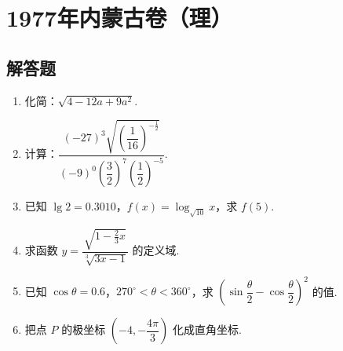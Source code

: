 \chapter{1977年内蒙古卷（理）}

\section{解答题}

\begin{problem}
\begin{enumerate}
\item 化简：\(\sqrt{4-12a+9a^2}\).

\item 计算：\(\dfrac{\left(-27\right)^3\sqrt{\left(\dfrac{1}{16}\right)^{-\frac{1}{2}}}}{\left(-9\right)^0\left(\dfrac{3}{2}\right)^7\left(\dfrac{1}{2}\right)^{-5}}\).

\item 已知 \(\lg2=0.3010\)，\(f\left(x\right)=\log_{\sqrt{10}}x\)，求 \(f\left(5\right)\).

\item 求函数 \(y=\dfrac{\sqrt{1-\frac{2}{3}x}}{\sqrt[3]{3x-1}}\) 的定义域.

\item 已知 \(\cos\theta=0.6\)，\(270^\circ<\theta<360^\circ\)，求 \(\left(\sin\dfrac{\theta}{2}-\cos\dfrac{\theta}{2}\right)^2\) 的值.

\item 把点 \(P\) 的极坐标 \(\left(-4,-\dfrac{4\pi}{3}\right)\) 化成直角坐标.
\end{enumerate}
\end{problem}

